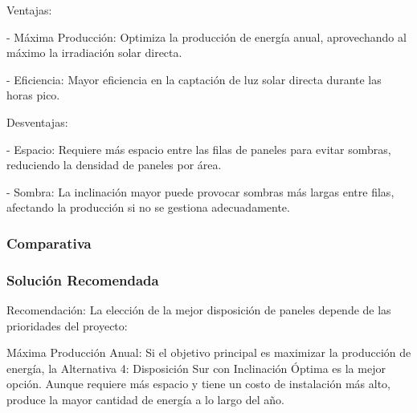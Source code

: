\documentclass[a4paper,12pt]{article}
\begin{document}
\begin{Form}
Ventajas:

- Máxima Producción: Optimiza la producción de energía anual, aprovechando al máximo la irradiación solar directa.

- Eficiencia: Mayor eficiencia en la captación de luz solar directa durante las horas pico.

Desventajas:

- Espacio: Requiere más espacio entre las filas de paneles para evitar sombras, reduciendo la densidad de paneles por área.

- Sombra: La inclinación mayor puede provocar sombras más largas entre filas, afectando la producción si no se gestiona adecuadamente.


\subsubsection*{Comparativa}

\datosNoNumericos



\begin{table}[ht]
    \centering
    \caption{Comparativa}
    \pgfplotstabletypeset[
        col sep=comma,
        every head row/.style={before row=\toprule, after row=\midrule},
        every last row/.style={after row=\bottomrule},
        string type %
    ]{\datosNoNumericos}
\end{table}


\subsubsection*{Solución Recomendada}

Recomendación: La elección de la mejor disposición de paneles depende de las prioridades del proyecto:

Máxima Producción Anual: Si el objetivo principal es maximizar la producción de energía, la Alternativa 4: Disposición Sur con Inclinación Óptima es la mejor opción. Aunque requiere más espacio y tiene un costo de instalación más alto, produce la mayor cantidad de energía a lo largo del año.


\end{Form}
\end{document}
